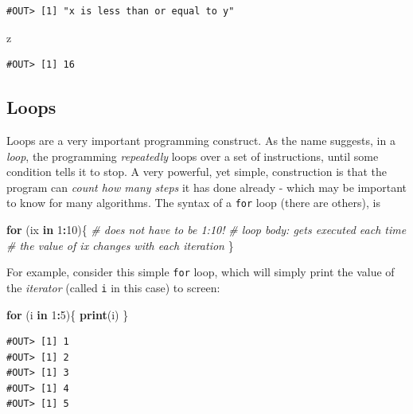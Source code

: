 \documentclass[]{book}
\newenvironment{Shaded}{\begin{snugshade}}{\end{snugshade}}
\newcommand{\KeywordTok}[1]{\textcolor[rgb]{0.13,0.29,0.53}{\textbf{#1}}}
\newcommand{\DecValTok}[1]{\textcolor[rgb]{0.00,0.00,0.81}{#1}}
\newcommand{\CommentTok}[1]{\textcolor[rgb]{0.56,0.35,0.01}{\textit{#1}}}
\newcommand{\ControlFlowTok}[1]{\textcolor[rgb]{0.13,0.29,0.53}{\textbf{#1}}}
\newcommand{\OperatorTok}[1]{\textcolor[rgb]{0.81,0.36,0.00}{\textbf{#1}}}
\newcommand{\NormalTok}[1]{#1}
\begin{document}
\begin{verbatim}
#OUT> [1] "x is less than or equal to y"
\end{verbatim}

\begin{Shaded}
\begin{Highlighting}[]
\NormalTok{z}
\end{Highlighting}
\end{Shaded}

\begin{verbatim}
#OUT> [1] 16
\end{verbatim}

\subsection{Loops}\label{loops}

Loops are a very important programming construct. As the name suggests,
in a \emph{loop}, the programming \emph{repeatedly} loops over a set of
instructions, until some condition tells it to stop. A very powerful,
yet simple, construction is that the program can \emph{count how many
steps} it has done already - which may be important to know for many
algorithms. The syntax of a \texttt{for} loop (there are others), is

\begin{Shaded}
\begin{Highlighting}[]
\ControlFlowTok{for}\NormalTok{ (ix }\ControlFlowTok{in} \DecValTok{1}\OperatorTok{:}\DecValTok{10}\NormalTok{)\{   }\CommentTok{# does not have to be 1:10!}
  \CommentTok{# loop body: gets executed each time}
  \CommentTok{# the value of ix changes with each iteration}
\NormalTok{\}}
\end{Highlighting}
\end{Shaded}

For example, consider this simple \texttt{for} loop, which will simply
print the value of the \emph{iterator} (called \texttt{i} in this case)
to screen:

\begin{Shaded}
\begin{Highlighting}[]
\ControlFlowTok{for}\NormalTok{ (i }\ControlFlowTok{in} \DecValTok{1}\OperatorTok{:}\DecValTok{5}\NormalTok{)\{}
  \KeywordTok{print}\NormalTok{(i)}
\NormalTok{\}}
\end{Highlighting}
\end{Shaded}

\begin{verbatim}
#OUT> [1] 1
#OUT> [1] 2
#OUT> [1] 3
#OUT> [1] 4
#OUT> [1] 5
\end{verbatim}
\end{document}
